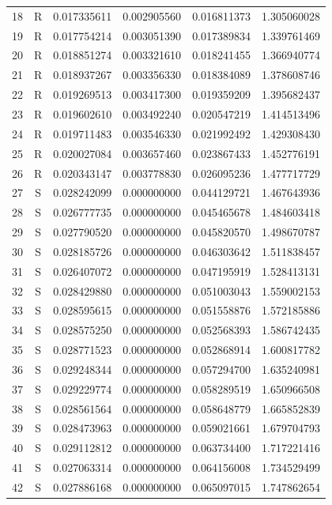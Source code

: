 \documentclass[11pt,a4paper]{article}
\theoremstyle{definition}
\theoremstyle{remark}
\begin{document}
\begin{longtable}{rcrrrr}
18 & R & 0.017335611 & 0.002905560 & 0.016811373 & 1.305060028 \\
19 & R & 0.017754214 & 0.003051390 & 0.017389834 & 1.339761469 \\
20 & R & 0.018851274 & 0.003321610 & 0.018241455 & 1.366940774 \\
21 & R & 0.018937267 & 0.003356330 & 0.018384089 & 1.378608746 \\
22 & R & 0.019269513 & 0.003417300 & 0.019359209 & 1.395682437 \\
23 & R & 0.019602610 & 0.003492240 & 0.020547219 & 1.414513496 \\
24 & R & 0.019711483 & 0.003546330 & 0.021992492 & 1.429308430 \\
25 & R & 0.020027084 & 0.003657460 & 0.023867433 & 1.452776191 \\
26 & R & 0.020343147 & 0.003778830 & 0.026095236 & 1.477717729 \\
27 & S & 0.028242099 & 0.000000000 & 0.044129721 & 1.467643936 \\
28 & S & 0.026777735 & 0.000000000 & 0.045465678 & 1.484603418 \\
29 & S & 0.027790520 & 0.000000000 & 0.045820570 & 1.498670787 \\
30 & S & 0.028185726 & 0.000000000 & 0.046303642 & 1.511838457 \\
31 & S & 0.026407072 & 0.000000000 & 0.047195919 & 1.528413131 \\
32 & S & 0.028429880 & 0.000000000 & 0.051003043 & 1.559002153 \\
33 & S & 0.028595615 & 0.000000000 & 0.051558876 & 1.572185886 \\
34 & S & 0.028575250 & 0.000000000 & 0.052568393 & 1.586742435 \\
35 & S & 0.028771523 & 0.000000000 & 0.052868914 & 1.600817782 \\
36 & S & 0.029248344 & 0.000000000 & 0.057294700 & 1.635240981 \\
37 & S & 0.029229774 & 0.000000000 & 0.058289519 & 1.650966508 \\
38 & S & 0.028561564 & 0.000000000 & 0.058648779 & 1.665852839 \\
39 & S & 0.028473963 & 0.000000000 & 0.059021661 & 1.679704793 \\
40 & S & 0.029112812 & 0.000000000 & 0.063734400 & 1.717221416 \\
41 & S & 0.027063314 & 0.000000000 & 0.064156008 & 1.734529499 \\
42 & S & 0.027886168 & 0.000000000 & 0.065097015 & 1.747862654 \\

\end{longtable}
\end{document}
